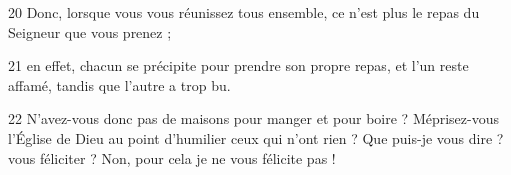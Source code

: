 20 Donc, lorsque vous vous réunissez tous ensemble, ce n’est plus le repas du Seigneur que vous prenez ;

21 en effet, chacun se précipite pour prendre son propre repas, et l’un reste affamé, tandis que l’autre a trop bu.

22 N’avez-vous donc pas de maisons pour manger et pour boire ? Méprisez-vous l’Église de Dieu au point d’humilier ceux qui n’ont rien ? Que puis-je vous dire ? vous féliciter ? Non, pour cela je ne vous félicite pas !

